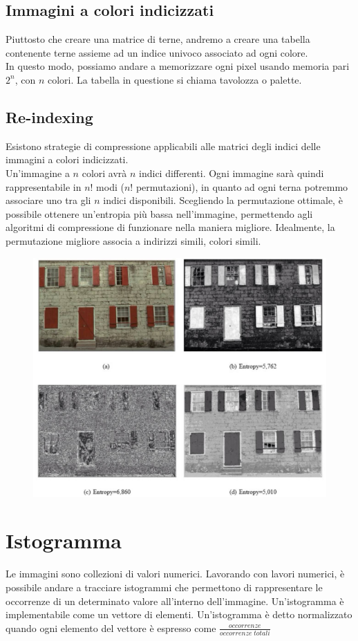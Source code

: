 \documentclass{report}
\begin{document}
	\section{Immagini a colori indicizzati}
	Piuttosto che creare una matrice di terne, andremo a creare una tabella contenente terne assieme ad un indice univoco associato ad ogni colore.\\
	In questo modo, possiamo andare a memorizzare ogni pixel usando memoria pari $2^n$, con $n$ colori.
	La tabella in questione si chiama tavolozza o palette.
	\section{Re-indexing}
	Esistono strategie di compressione applicabili alle matrici degli indici delle immagini a colori indicizzati.\\
	Un'immagine a $n$ colori avrà $n$ indici differenti.
	Ogni immagine sarà quindi rappresentabile in $n!$ modi ($n!$ permutazioni), in quanto ad ogni terna potremmo associare uno tra gli $n$ indici disponibili.
	Scegliendo la permutazione ottimale, è possibile ottenere un'entropia più bassa nell'immagine, permettendo agli algoritmi di compressione di funzionare nella maniera migliore.
	Idealmente, la permutazione migliore associa a indirizzi simili, colori simili.
	\begin{figure}[htp]
		\centering
		\includegraphics[width=0.85\linewidth]{entropia.jpg}
	\end{figure}
	\newpage
	\chapter{Istogramma}
	Le immagini sono collezioni di valori numerici.
	Lavorando con lavori numerici, è possibile andare a tracciare istogrammi che permettono di rappresentare le occorrenze di un determinato valore all'interno dell'immagine.
	Un'istogramma è implementabile come un vettore di elementi.
	Un'istogramma è detto normalizzato quando ogni elemento del vettore è espresso come $\frac{occorrenze}{occorrenze \; totali}$
\end{document}
